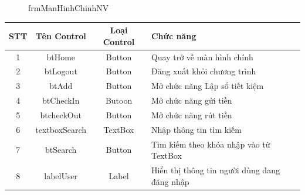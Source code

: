 \documentclass{article}
\begin{document}
\begin{enumerate}
\begin{itemize}
					\begin{figure}[!h]
						\setlength\fboxsep{1pt}
						\setlength\fboxrule{1pt}
						\caption{frmManHinhChinhNV}
						\label{fig:frmManHinhChinhNV}
					\end{figure}
					
					
			
	
						\begin{tabular}{|c|c|c|p{5cm}|}
						
						\hline
						STT & Tên Control & Loại Control & Chức năng \\
						\hline
						1 & btHome & Button & Quay trở về màn hình chính\\
						\hline
						2 & btLogout & Button & Đăng xuất khỏi chương trình \\
						\hline
						3 & btAdd & Button & Mở chức năng Lập sổ tiết kiệm \\
						\hline
						4 & btCheckIn & Butoon & Mở chức năng gửi tiền \\
						\hline
						5 & btcheckOut & Button & Mở chức năng rút tiền \\
						\hline
						6 & textboxSearch & TextBox & Nhập thông tin tìm kiếm \\
						\hline
						7 & btSearch & Button & Tìm kiếm theo khóa nhập vào từ TextBox\\
						\hline
						8 & labelUser & Label & Hiển thị thông tin người dùng đang đăng nhập\\
						\hline
					\end{tabular}
			
				
					

\end{itemize}
\end{enumerate}
\end{document}
